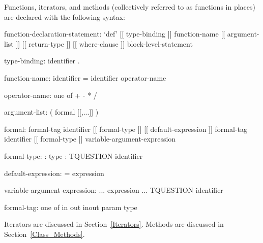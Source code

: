 Functions, iterators, and methods (collectively referred to as
functions in places) are declared with the following syntax:
\begin{syntax}
function-declaration-statement:
  `def' [[ type-binding ]] function-name [[ argument-list ]]
    [[ return-type ]] [[ where-clause ]] block-level-statement

type-binding:
  identifier .

function-name:
  identifier
  = identifier
  operator-name

operator-name: one of
  + - * / %

argument-list:
  ( formal [[,...]] )

formal:
  formal-tag identifier [[ formal-type ]] [[ default-expression ]]
  formal-tag identifier [[ formal-type ]] variable-argument-expression

formal-type:
  : type
  : TQUESTION identifier

default-expression:
  = expression

variable-argument-expression:
  ... expression
  ... TQUESTION identifier

formal-tag: one of
  in out inout param type
\end{syntax}
Iterators are discussed in Section~\ref{Iterators}.  Methods are
discussed in Section~\ref{Class_Methods}.
